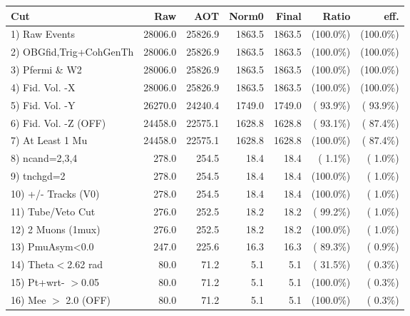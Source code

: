  \begin{table}[h!]\centering
 \begin{tabular}{||l||r|r|r|r|r|r||}
 \hline
 \hline
 Cut & Raw & AOT & Norm0 & Final & Ratio & eff.       \\
 \hline
  1) Raw Events           &      28006.0 &      25826.9 &       1863.5 &       1863.5 & (100.0\%) & (100.0\%) \\
  2) OBGfid,Trig+CohGenTh &      28006.0 &      25826.9 &       1863.5 &       1863.5 & (100.0\%) & (100.0\%) \\
  3) Pfermi \& W2         &      28006.0 &      25826.9 &       1863.5 &       1863.5 & (100.0\%) & (100.0\%) \\
  4) Fid. Vol. -X         &      28006.0 &      25826.9 &       1863.5 &       1863.5 & (100.0\%) & (100.0\%) \\
  5) Fid. Vol. -Y         &      26270.0 &      24240.4 &       1749.0 &       1749.0 & ( 93.9\%) & ( 93.9\%) \\
  6) Fid. Vol. -Z (OFF)   &      24458.0 &      22575.1 &       1628.8 &       1628.8 & ( 93.1\%) & ( 87.4\%) \\
  7) At Least 1 Mu        &      24458.0 &      22575.1 &       1628.8 &       1628.8 & (100.0\%) & ( 87.4\%) \\
  8) ncand=2,3,4          &        278.0 &        254.5 &         18.4 &         18.4 & (  1.1\%) & (  1.0\%) \\
  9) tnchgd=2             &        278.0 &        254.5 &         18.4 &         18.4 & (100.0\%) & (  1.0\%) \\
 10) +/- Tracks (V0)      &        278.0 &        254.5 &         18.4 &         18.4 & (100.0\%) & (  1.0\%) \\
 11) Tube/Veto Cut        &        276.0 &        252.5 &         18.2 &         18.2 & ( 99.2\%) & (  1.0\%) \\
 12) 2 Muons (1mux)       &        276.0 &        252.5 &         18.2 &         18.2 & (100.0\%) & (  1.0\%) \\
 13) PmuAsym<0.0          &        247.0 &        225.6 &         16.3 &         16.3 & ( 89.3\%) & (  0.9\%) \\
 14) Theta$<$2.62 rad     &         80.0 &         71.2 &          5.1 &          5.1 & ( 31.5\%) & (  0.3\%) \\
 15) Pt+wrt- $>$0.05      &         80.0 &         71.2 &          5.1 &          5.1 & (100.0\%) & (  0.3\%) \\
 16) Mee $>$ 2.0  (OFF)   &         80.0 &         71.2 &          5.1 &          5.1 & (100.0\%) & (  0.3\%) \\

\end{tabular}
\end{table}
